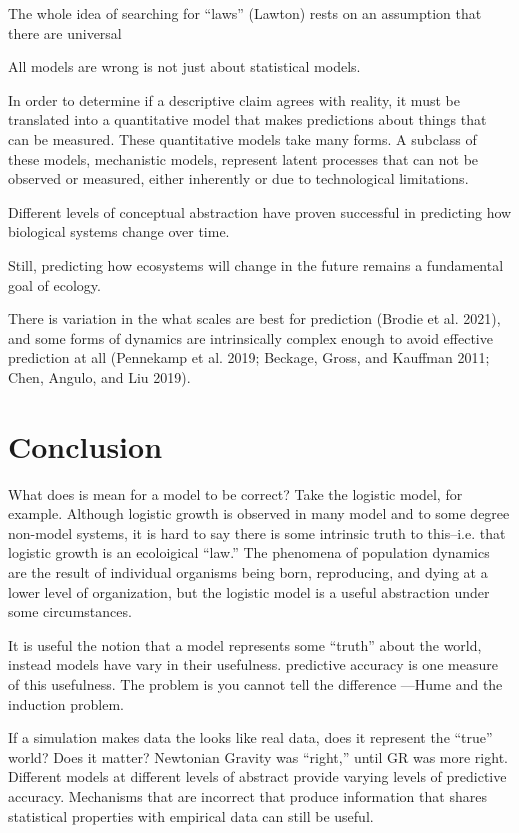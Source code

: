 \documentclass[11pt]{article}
\begin{document}
The whole idea of searching for ``laws'' (Lawton) rests on an assumption
that there are universal

All models are wrong is not just about statistical models.

In order to determine if a descriptive claim agrees with reality, it
must be translated into a quantitative model that makes predictions
about things that can be measured. These quantitative models take many
forms. A subclass of these models, mechanistic models, represent latent
processes that can not be observed or measured, either inherently or due
to technological limitations.

Different levels of conceptual abstraction have proven successful in
predicting how biological systems change over time.

Still, predicting how ecosystems will change in the future remains a
fundamental goal of ecology.

There is variation in the what scales are best for prediction (Brodie et
al. 2021), and some forms of dynamics are intrinsically complex enough
to avoid effective prediction at all (Pennekamp et al. 2019; Beckage,
Gross, and Kauffman 2011; Chen, Angulo, and Liu 2019).

\hypertarget{conclusion}{%
\section{Conclusion}\label{conclusion}}

What does is mean for a model to be correct? Take the logistic model,
for example. Although logistic growth is observed in many model and to
some degree non-model systems, it is hard to say there is some intrinsic
truth to this--i.e. that logistic growth is an ecoloigical ``law.'' The
phenomena of population dynamics are the result of individual organisms
being born, reproducing, and dying at a lower level of organization, but
the logistic model is a useful abstraction under some circumstances.

It is useful the notion that a model represents some ``truth'' about the
world, instead models have vary in their usefulness. predictive accuracy
is one measure of this usefulness. The problem is you cannot tell the
difference ---Hume and the induction problem.

If a simulation makes data the looks like real data, does it represent
the ``true'' world? Does it matter? Newtonian Gravity was ``right,''
until GR was more right. Different models at different levels of
abstract provide varying levels of predictive accuracy. Mechanisms that
are incorrect that produce information that shares statistical
properties with empirical data can still be useful.
\end{document}
